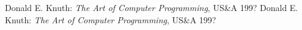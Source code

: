\begin{thebibliography}{mmi}

 Donald E. Knuth: \emph{The Art of Computer Programming}, US\&A 199?
 Donald E. Knuth: \emph{The Art of Computer Programming}, US\&A 199?
\end{thebibliography}
